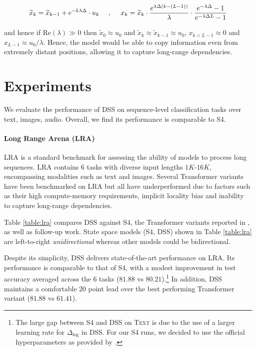 \begin{equation*}
\widetilde{x}_{k} = \widetilde{x}_{k-1} + e^{-k\lambda\Delta} \cdot u_k  \ \ \ \ ,\ \ \ \ x_k = \widetilde{x}_k \cdot {e^{\lambda\Delta (k-(L-1))} \over \lambda}\cdot {e^{-\lambda\Delta}-1 \over e^{-\lambda\Delta L} - 1 }
\end{equation*}

and hence if $\mathrm{Re}(\lambda) \gg 0$ then $\widetilde{x}_0 \approx u_0$ and $\widetilde{x}_k \approx \widetilde{x}_{k-1} \approx u_0$, $x_{k < L-1} \approx 0$ and $x_{L-1} \approx u_0 / \lambda$. Hence, the model would be able to copy information even from extremely distant positions, allowing it to capture long-range dependencies.

\section{Experiments}\label{sec:experiments}

We evaluate the performance of DSS on sequence-level classification tasks over text, images, audio. Overall, we find its performance is comparable to S4.

\paragraph{Long Range Arena (LRA)} LRA \cite{tay2021long} is a standard benchmark for assessing the ability of models to process long sequences. LRA contains $6$ tasks with diverse input lengths $1K$-$16K$, encompassing modalities such as text and images. Several Transformer variants have been benchmarked on LRA but all have underperformed due to factors such as their high compute-memory requirements, implicit locality bias and inability to capture long-range dependencies.

Table \ref{table:lra} compares DSS against S4, the Transformer variants reported in \cite{tay2021long}, as well as follow-up work. State space models (S4, DSS) shown in Table \ref{table:lra} are left-to-right \textit{unidirectional} whereas other models could be bidirectional.

Despite its simplicity, DSS delivers state-of-the-art performance on LRA. Its performance is comparable to that of S4, with a modest improvement in test accuracy averaged across the 6 tasks ($81.88$ vs $80.21$).\footnote{The large gap between S4 and DSS on \textsc{Text} is due to the use of a larger learning rate for $\Delta_{\log}$ in DSS. For our S4 runs, we decided to use the official hyperparameters as provided by \cite{gu2022efficiently}.} In addition, DSS maintains a comfortable $20$ point lead over the best performing Transformer variant ($81.88$ vs $61.41$).

